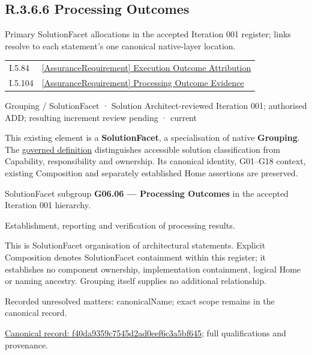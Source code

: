 \subsection*{R.3.6.6 Processing Outcomes}
\label{navigation:R.3.6.6}

Primary SolutionFacet allocations in the accepted Iteration 001 register; links resolve to each statement’s one canonical native-layer location.\par
\begin{longtable}{p{.22\linewidth}p{.73\linewidth}}
I.5.84 & \hyperref[element:79177908b67243a4a5f86fa180f5fd22]{[AssuranceRequirement] Execution Outcome Attribution} \\
I.5.104 & \hyperref[element:8ac5880576ad4f8fa9612f231178a06c]{[AssuranceRequirement] Processing Outcome Evidence} \\
\end{longtable}
\label{element:f40da9359c7545d2ad0eef6c3a5bf645}
{\small Grouping / SolutionFacet · Solution Architect-reviewed Iteration 001; authorised ADD; resulting increment review pending · current}\par

This existing element is a \textbf{SolutionFacet}, a specialisation of native
\textbf{Grouping}. The \href{\detokenize{../../../../../../../governance/continuum-representation.md#solutionfacet-classification--1119-candidate}}{governed definition}
distinguishes accessible solution classification from Capability, responsibility
and ownership. Its canonical identity, G01–G18 context, existing Composition
and separately established Home assertions are preserved.



SolutionFacet subgroup \textbf{G06.06 — Processing Outcomes} in the accepted Iteration 001 hierarchy.



Establishment, reporting and verification of processing results.



This is SolutionFacet organisation of architectural statements. Explicit Composition denotes SolutionFacet containment within this register; it establishes no component ownership, implementation containment, logical Home or naming ancestry. Grouping itself supplies no additional relationship.


{\small Recorded unresolved matters: canonicalName; exact scope remains in the canonical record.}\par
{\footnotesize \href{../../../../../../../continuum/grouping/f40da9359c7545d2ad0eef6c3a5bf645.md}{Canonical record: f40da9359c7545d2ad0eef6c3a5bf645}; full qualifications and provenance.}\par
